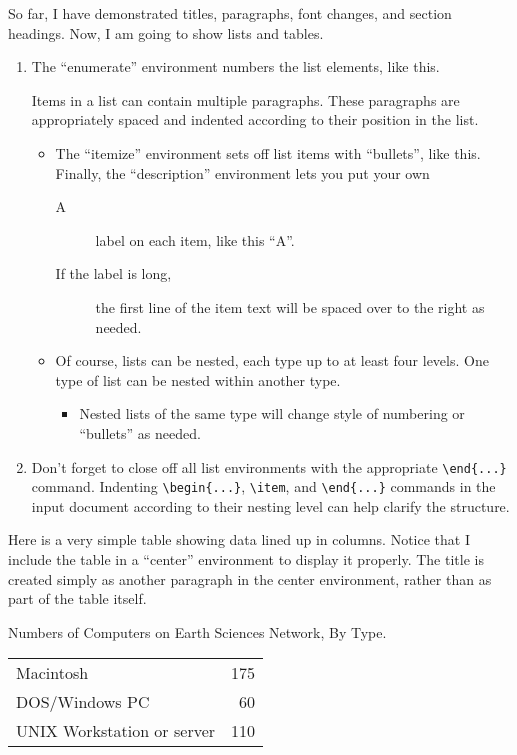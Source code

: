 So far, I have demonstrated titles, paragraphs, font changes, and
section headings.
Now, I am going to show lists and tables.
\begin{enumerate}
\item 
The ``enumerate'' environment numbers the list elements, like this.

Items in a list can contain multiple paragraphs.
These paragraphs are appropriately spaced and indented according to their
position in the list.
   \begin{itemize}
   \item The ``itemize'' environment sets off list items with ``bullets'',
like this.  Finally, the ``description'' environment lets you put your own
      \begin{description}
      \item[A] label on each item, like this ``A''.
      \item[If the label is long,] the first line of the item text will
be spaced over to the right as needed.
      \end{description}
   \item Of course, lists can be nested, each type up to at least four levels.
One type of list can be nested within another type.
      \begin{itemize}
      \item Nested lists of the same type will change style of numbering 
or ``bullets'' as needed.
      \end{itemize}
   \end{itemize}
\item Don't forget to close off all list environments with the 
appropriate \verb+\end{...}+ command.
Indenting \verb+\begin{...}+, \verb+\item+, and \verb+\end{...}+
commands in the input document according to their nesting level can help 
clarify the structure.
\end{enumerate}

Here is a very simple table showing data lined up in columns.
Notice that I include the table in a ``center'' environment to display
it properly.
The title is created simply as another paragraph in the center environment,
rather than as part of the table itself.
\begin{center}
Numbers of Computers on Earth Sciences Network, By Type.

\begin{tabular}{lr}
Macintosh&175\\
DOS/Windows PC&60\\
UNIX Workstation or server&110\\
\end{tabular}
\end{center}


